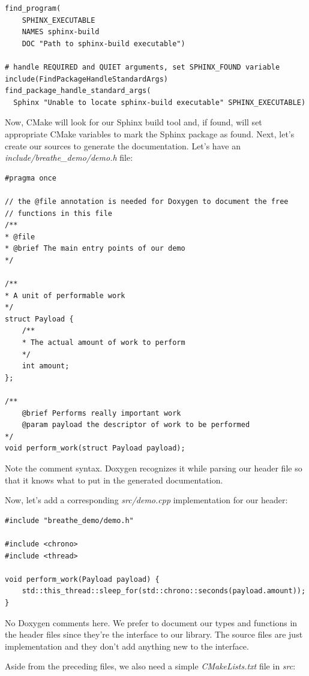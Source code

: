 \begin{lstlisting}[style=styleCMake]
find_program(
	SPHINX_EXECUTABLE
	NAMES sphinx-build
	DOC "Path to sphinx-build executable")

# handle REQUIRED and QUIET arguments, set SPHINX_FOUND variable
include(FindPackageHandleStandardArgs)
find_package_handle_standard_args(
  Sphinx "Unable to locate sphinx-build executable" SPHINX_EXECUTABLE)
\end{lstlisting}

Now, CMake will look for our Sphinx build tool and, if found, will set appropriate CMake variables to mark the Sphinx package as found. Next, let's create our sources to generate the documentation. Let's have an \textit{include/breathe\_demo/demo.h} file:

\begin{lstlisting}[style=styleCXX]
#pragma once

// the @file annotation is needed for Doxygen to document the free
// functions in this file
/**
* @file
* @brief The main entry points of our demo
*/

/**
* A unit of performable work
*/
struct Payload {
	/**
	* The actual amount of work to perform
	*/
	int amount;
};

/**
	@brief Performs really important work
	@param payload the descriptor of work to be performed
*/
void perform_work(struct Payload payload);
\end{lstlisting}

Note the comment syntax. Doxygen recognizes it while parsing our header file so that it knows what to put in the generated documentation.

Now, let's add a corresponding \textit{src/demo.cpp} implementation for our header:

\begin{lstlisting}[style=styleCXX]
#include "breathe_demo/demo.h"

#include <chrono>
#include <thread>

void perform_work(Payload payload) {
	std::this_thread::sleep_for(std::chrono::seconds(payload.amount));
}	
\end{lstlisting}

No Doxygen comments here. We prefer to document our types and functions in the header files since they're the interface to our library. The source files are just implementation and they don't add anything new to the interface.

Aside from the preceding files, we also need a simple \textit{CMakeLists.txt} file in \textit{src}:

